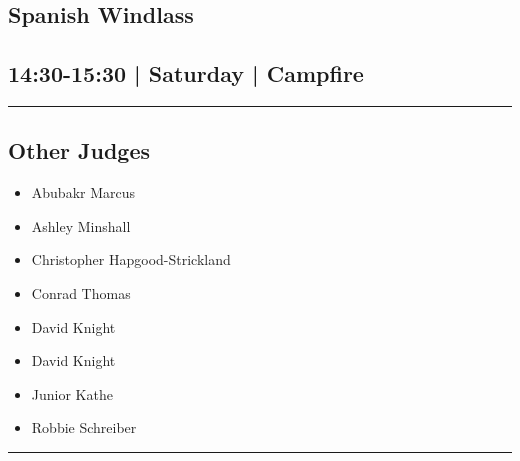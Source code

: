 \documentclass[10pt, A5]{article}
\begin{document}
        \begin{framed}
        \begin{minipage}{\textwidth}

        \setcounter{section}{19}
        \section{Spanish Windlass}
        \subsection*{14:30-15:30 | Saturday | Campfire}

        \vspace{0.25cm}
        \hrule
        \vspace{0.25cm}


        \subsection*{Other Judges}
                    

        	\begin{multicols}{2}

		\begin{itemize}
									\item Abubakr Marcus
									\item Ashley Minshall
									\item Christopher Hapgood-Strickland
									\item Conrad Thomas
									\item David Knight
						\end{itemize}

		\vfill\null
		\columnbreak

		\begin{itemize}
									\item David Knight
									\item Junior Kathe
									\item Robbie Schreiber
						\end{itemize}

		\vfill\null

		\end{multicols}

    \vspace{0.25cm}
        \hrule
        \vspace{0.25cm}

        \begin{multicols}{2}


\end{multicols}
\end{minipage}
\end{framed}
\end{document}
